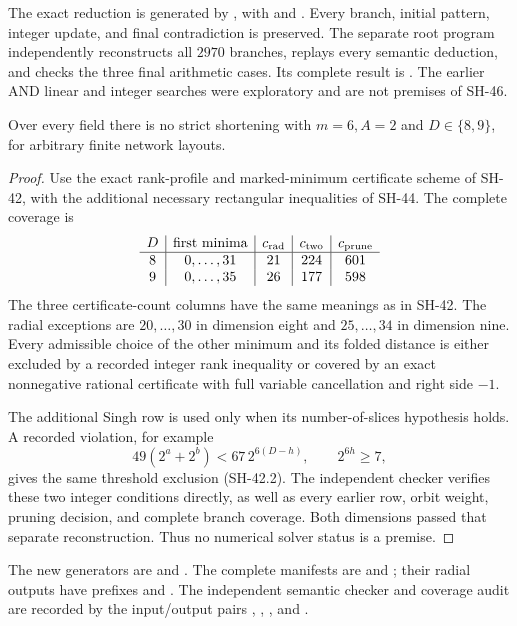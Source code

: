 The exact reduction is generated by
,
with 
and .
Every branch, initial pattern, integer update, and
final contradiction is preserved.  The separate
root program
independently reconstructs all $2970$ branches,
replays every semantic deduction, and checks the
three final arithmetic cases.  Its complete result
is .
The earlier AND linear and integer searches were
exploratory and are not premises of SH-46.

\begin{theorem}
\label{thm:width-six-dimensions-eight-nine}
Over every field there is no strict shortening with
$m=6,A=2$ and $D\in\{8,9\}$, for arbitrary finite
network layouts.
\end{theorem}
\begin{proof}
Use the exact rank-profile and marked-minimum
certificate scheme of SH-42, with the additional
necessary rectangular inequalities of SH-44.
The complete coverage is
\[
\begin{array}{c|c|c|c|c}
D&\text{first minima}&c_{\rm rad}&c_{\rm two}&c_{\rm prune}\\\hline
8&0,\ldots,31&21&224&601\\
9&0,\ldots,35&26&177&598
\end{array}
\]
The three certificate-count columns have the
same meanings as in SH-42.  The radial exceptions
are $20,\ldots,30$ in dimension eight and
$25,\ldots,34$ in dimension nine.  Every
admissible choice of the other minimum and its
folded distance is either excluded by a recorded
integer rank inequality or covered by an exact
nonnegative rational certificate with full
variable cancellation and right side $-1$.

The additional Singh row is used only when
its number-of-slices hypothesis holds.  A recorded
violation, for example
\[
 49(2^a+2^b)<67\,2^{6(D-h)},\qquad 2^{6h}\ge7,
\]
gives the same threshold exclusion (SH-42.2).
The independent checker verifies these two
integer conditions directly, as well as every
earlier row, orbit weight, pruning decision,
and complete branch coverage.  Both dimensions
passed that separate reconstruction.  Thus
no numerical solver status is a premise.
\end{proof}

The new generators are
and .
The complete manifests are
and ;
their radial outputs have prefixes
 and
.
The independent semantic checker and coverage audit
are recorded by the input/output pairs
,
,
, and
.

